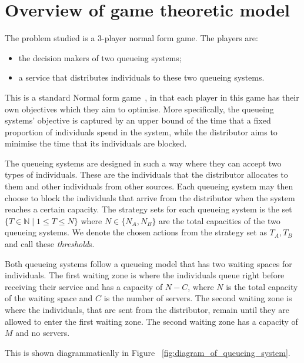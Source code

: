 \section{Overview of game theoretic model}

The problem studied is a 3-player normal form game. The players are:
  
\begin{itemize}
    \item the decision makers of two queueing systems;
    \item a service that distributes individuals to these two queueing systems.
\end{itemize}

This is a standard Normal form game~\cite{Maschler2013},  
in that each player in this game has their own objectives which they aim to 
optimise.
More specifically, the queueing systems' objective is captured by an upper bound
of the time that a fixed proportion of individuals spend in the system, 
while the distributor aims to minimise the time that its individuals 
are blocked.

The queueing systems are designed in such a way where they can accept two types
of individuals. 
These are the individuals that the distributor allocates to them and 
other individuals from other sources. 
Each queueing system may then choose to block the individuals that arrive from 
the distributor when the system reaches a certain capacity. 
The strategy sets for each queueing system is the set 
\( \{T \in \mathbb{N} \;|\; 1 \leq T \leq N\} \) where \(N \in\{N_A, N_B\}\) are 
the total capacities of the two queueing systems. We denote the chosen actions 
from the strategy set as \(T_A, T_B\) and call these \textit{threshold}s.

Both queueing systems follow a queueing model that has two waiting spaces for 
individuals. 
The first waiting zone is where the individuals queue right before receiving 
their service and has a capacity of \( N - C \), where \(N\) is the total 
capacity of the waiting space and \(C\) is the number of servers. 
The second waiting zone is where the individuals, that are sent from the 
distributor, remain until they are allowed to enter the first waiting zone.
The second waiting zone has a capacity of \(M\) and no servers.

This is shown diagrammatically in Figure ~\ref{fig:diagram_of_queueing_system}.

